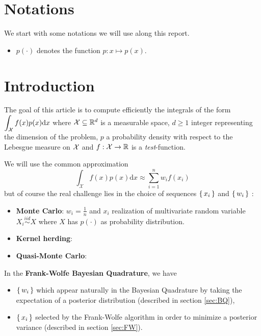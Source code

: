 \section*{Notations}
We start with some notations we will use along this report.
\begin{itemize}[font= \color{blue} \large, label= $\bullet$]
 \item $p(\cdot)$ denotes the function $p: x \mapsto p(x)$.
\end{itemize}

\section*{Introduction}

The goal of this article \cite{FWBQ} is to compute efficiently the integrals of the form
$ \displaystyle \int _ { \mathcal{X} } f ( x ) p ( x ) \mathrm { d } x$
where $\mathcal{X} \subseteq \mathbb{R} ^ { d }$ is a measurable space,
$d \geq 1$ integer representing the dimension of the problem, $p$ a probability
density with respect to the Lebesgue measure on $\mathcal{X}$ and $f : \mathcal{X} \rightarrow \mathbb{R}$
 is a \textit{test}-function.

 We will use the common approximation
 \begin{equation}
\int _ { \mathcal { X } } f ( x ) p ( x ) \mathrm { d } x \approx \sum _ { i = 1 } ^ { n } w _ { i } f \left( x _ { i } \right)
 \end{equation}
 but of course the real challenge lies in the choice of sequences $\left \{ \, x_i \, \right \}$ and
 $\left \{ \, w_i \, \right \}$ :
  \begin{itemize}[font= \color{blue} \large, label= $\bullet$]
    \item \textbf{Monte Carlo}: $w_i = \frac{1}{n}$ and $x_i$ realization of multivariate
    random variable $X_i \stackrel{iid}{\sim} X$ where $X$ has $p(\cdot)$ as probability
    distribution.
    \item \textbf{Kernel herding}:
    \item \textbf{Quasi-Monte Carlo}:
  \end{itemize}

  In the \textbf{Frank-Wolfe Bayesian Quadrature}, we have
  \begin{itemize}[font= \color{blue} \large, label= ]
\item $\left \{ \, w_i \, \right \}$ which appear naturally in the Bayesian Quadrature by taking the expectation of a posterior distribution  (described in section \ref{sec:BQ}),
\item $\left \{ \, x_i \, \right \}$ selected by the Frank-Wolfe algorithm in order to minimize a posterior variance (described in section \ref{sec:FW}).
  \end{itemize}

